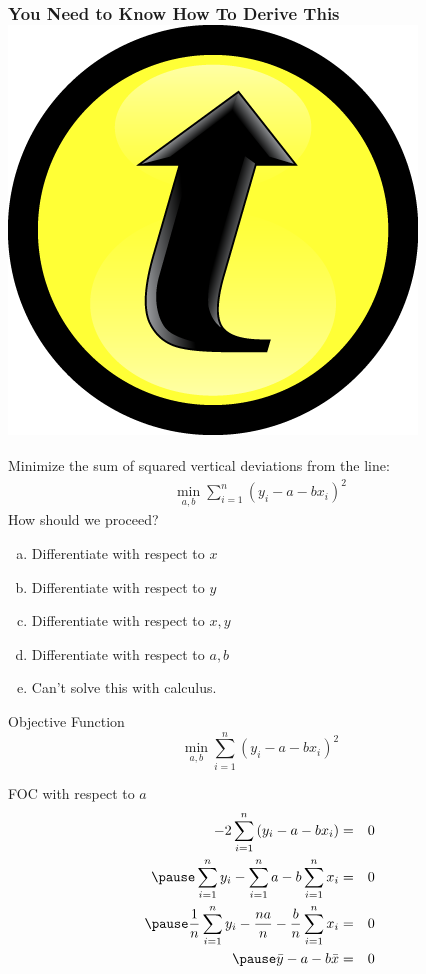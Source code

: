 \documentclass[handout]{beamer}
\begin{document}
\begin{frame}
\frametitle{You Need to Know How To Derive This \hfill \includegraphics[scale = 0.05]{./images/clicker}}
\alert{Minimize the sum of squared vertical deviations from the line:}
\begin{eqnarray*}
\min_{a,b}  \sum_{i=1}^n (y_i - a - b x_i)^2
\end{eqnarray*}
How should we proceed?
\begin{enumerate}[(a)]
	\item Differentiate with respect to $x$
	\item Differentiate with respect to $y$
	\item Differentiate with respect to $x,y$
	\item Differentiate with respect to $a,b$
	\item Can't solve this with calculus.
\end{enumerate}
\end{frame}
\begin{frame}
\begin{block}{Objective Function}
$$\displaystyle \min_{a,b}  \sum_{i=1}^n (y_i - a - b x_i)^2$$
\end{block}
\begin{block}{FOC with respect to $a$}\pause
\begin{eqnarray*}
	-2 \sum_{i=1}^n\left(y_i - a -bx_i\right) &=& 0 \\\pause
	\sum_{i=1}^n y_i - \sum_{i=1}^n a - b\sum_{i=1}^n x_i &=& 0 \\\pause
	\frac{1}{n} \sum_{i=1}^n y_i - \frac{na}{n} -  \frac{b}{n} \sum_{i=1}^n x_i &=& 0\\\pause
	\bar{y} - a - b\bar{x} &=& 0
\end{eqnarray*}
\end{block}
\end{frame}
\end{document}
